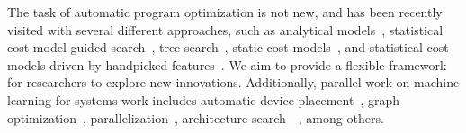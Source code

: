 The task of automatic program optimization is not new, and has been recently visited with several different approaches, such as analytical models~\cite{mullapudi2016automatically}, statistical cost model guided search~\cite{NIPS2018_7599}, tree search~\cite{Adams2019LearningTO}, static cost models~\cite{Kim:2019:CGH:3314872.3314885}, and statistical cost models driven by handpicked features~\cite{Li:2018:DPI}.
We aim to provide a flexible framework for researchers to explore new innovations.
Additionally, parallel work on machine learning for systems work includes automatic device placement~\cite{mirhoseini2017device}, graph optimization~\cite{metaflow_sysml19}, parallelization~\cite{soap_sysml19}, architecture search~\cite{tan2019mnasnet}~\cite{zoph2018learning}, among others. 

